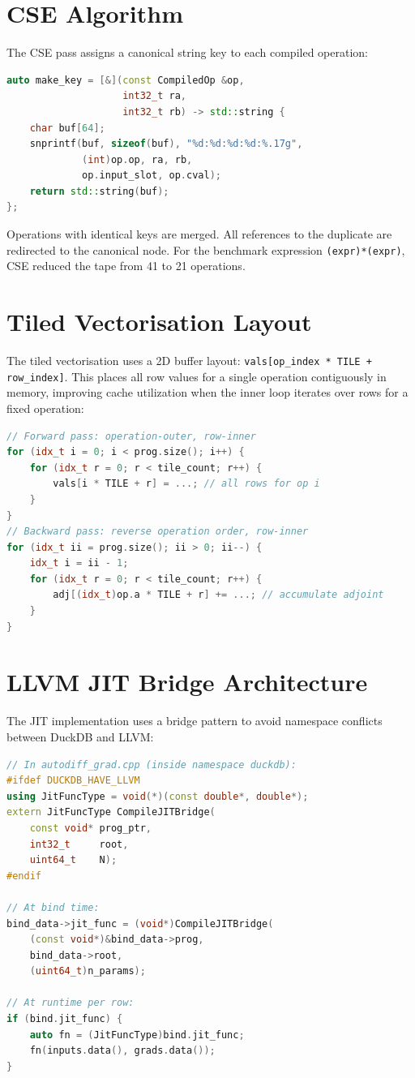 \documentclass[12pt]{report}
\begin{document}
\section{CSE Algorithm}

The CSE pass assigns a canonical string key to each compiled operation:

\begin{lstlisting}[language=C++]
auto make_key = [&](const CompiledOp &op,
                    int32_t ra,
                    int32_t rb) -> std::string {
    char buf[64];
    snprintf(buf, sizeof(buf), "%d:%d:%d:%d:%.17g",
             (int)op.op, ra, rb,
             op.input_slot, op.cval);
    return std::string(buf);
};
\end{lstlisting}

Operations with identical keys are merged. All references to the duplicate
are redirected to the canonical node. For the benchmark expression
\texttt{(expr)*(expr)}, CSE reduced the tape from 41 to 21 operations.

\section{Tiled Vectorisation Layout}

The tiled vectorisation uses a 2D buffer layout:
\texttt{vals[op\_index * TILE + row\_index]}. This places all row values
for a single operation contiguously in memory, improving cache utilization
when the inner loop iterates over rows for a fixed operation:

\begin{lstlisting}[language=C++]
// Forward pass: operation-outer, row-inner
for (idx_t i = 0; i < prog.size(); i++) {
    for (idx_t r = 0; r < tile_count; r++) {
        vals[i * TILE + r] = ...; // all rows for op i
    }
}
// Backward pass: reverse operation order, row-inner
for (idx_t ii = prog.size(); ii > 0; ii--) {
    idx_t i = ii - 1;
    for (idx_t r = 0; r < tile_count; r++) {
        adj[(idx_t)op.a * TILE + r] += ...; // accumulate adjoint
    }
}
\end{lstlisting}

\section{LLVM JIT Bridge Architecture}

The JIT implementation uses a bridge pattern to avoid namespace conflicts
between DuckDB and LLVM:

\begin{lstlisting}[language=C++]
// In autodiff_grad.cpp (inside namespace duckdb):
#ifdef DUCKDB_HAVE_LLVM
using JitFuncType = void(*)(const double*, double*);
extern JitFuncType CompileJITBridge(
    const void* prog_ptr,
    int32_t     root,
    uint64_t    N);
#endif

// At bind time:
bind_data->jit_func = (void*)CompileJITBridge(
    (const void*)&bind_data->prog,
    bind_data->root,
    (uint64_t)n_params);

// At runtime per row:
if (bind.jit_func) {
    auto fn = (JitFuncType)bind.jit_func;
    fn(inputs.data(), grads.data());
}
\end{lstlisting}
\end{document}
